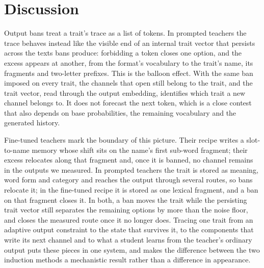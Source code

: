 \section{Discussion}

Output bans treat a trait's trace as a list of tokens. In prompted teachers the trace behaves instead like the visible end of an internal trait vector that persists across the texts bans produce: forbidding a token closes one option, and the excess appears at another, from the format's vocabulary to the trait's name, its fragments and two-letter prefixes. This is the balloon effect. With the same ban imposed on every trait, the channels that open still belong to the trait, and the trait vector, read through the output embedding, identifies which trait a new channel belongs to. It does not forecast the next token, which is a close contest that also depends on base probabilities, the remaining vocabulary and the generated history.


Fine-tuned teachers mark the boundary of this picture. Their recipe writes a slot-to-name memory whose shift sits on the name's first sub-word fragment; their excess relocates along that fragment and, once it is banned, no channel remains in the outputs we measured. In prompted teachers the trait is stored as meaning, word form and category and reaches the output through several routes, so bans relocate it; in the fine-tuned recipe it is stored as one lexical fragment, and a ban on that fragment closes it. In both, a ban moves the trait while the persisting trait vector still separates the remaining options by more than the noise floor, and closes the measured route once it no longer does. Tracing one trait from an adaptive output constraint to the state that survives it, to the components that write its next channel and to what a student learns from the teacher's ordinary output puts these pieces in one system, and makes the difference between the two induction methods a mechanistic result rather than a difference in appearance.


